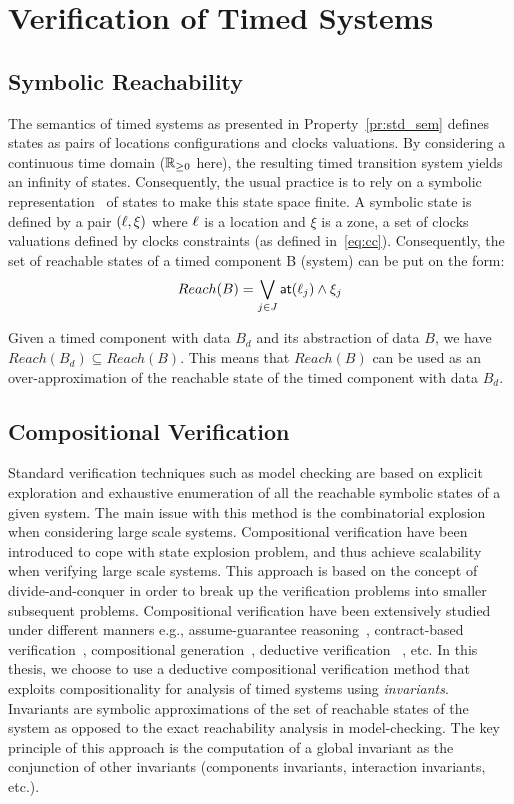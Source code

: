 \section{Verification of Timed Systems}\label{sec:2.4}
\subsection{Symbolic Reachability}

The semantics of timed systems as presented in Property~\ref{pr:std_sem} 
defines states as pairs of locations configurations and clocks
valuations. By considering a continuous time domain ($\mathbb{R}_{\ge 0}$ here), the 
resulting timed transition system yields an infinity of states.
Consequently, the usual practice is to rely on a symbolic representation~\cite{}
of states to make this state space finite.
A symbolic state is defined by a pair $(\ell,\xi)$ where $\ell$ is a location
and $\xi$ is a zone, a set of clocks valuations defined by clocks constraints
(as defined in~\ref{eq:cc}). Consequently, the set of reachable states of a 
timed component B (system) can be put on the form:
\begin{displaymath}
  Reach(B)=\bigvee_{j\in{J}}\textsf{at}(\ell_j)\wedge\xi_j
\end{displaymath}

Given a timed component with data $B_d$ and its abstraction of data $B$, we have
$Reach(B_d)\subseteq Reach(B)$. This means that $Reach(B)$ can be used as an over-approximation
of the reachable state of the timed component with data $B_d$.
\subsection{Compositional Verification}

Standard verification techniques such as model checking are based on explicit 
exploration and exhaustive enumeration of all the reachable symbolic states 
of a given system. The main issue with this 
method is the combinatorial explosion when considering large scale systems.
Compositional verification have been introduced to cope with state explosion
problem, and thus achieve scalability when verifying large scale systems.
This approach is based on the concept of divide-and-conquer in order to 
break up the verification
problems into smaller subsequent problems. Compositional verification have been 
extensively studied under different manners e.g., assume-guarantee 
reasoning~\cite{}, 
contract-based verification~\cite{}, compositional generation~\cite{}, 
deductive verification
~\cite{}, etc.  
In this thesis, we choose to use a deductive compositional verification 
method that exploits compositionality for analysis of timed systems 
using \emph{invariants}. Invariants are symbolic approximations of the set 
of reachable states of the system as opposed to the exact 
reachability analysis in model-checking. The key principle of this 
approach is the computation of a global invariant as the conjunction of
other invariants (components invariants, interaction invariants, etc.).



